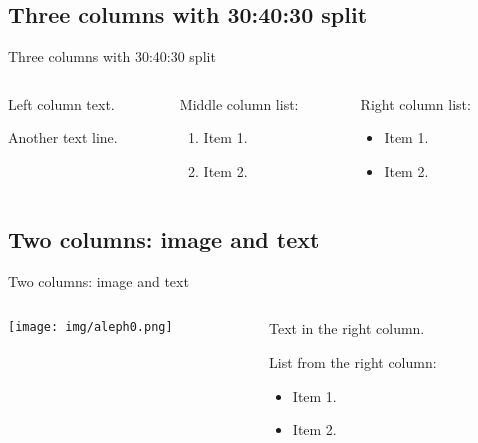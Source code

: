 \documentclass[
  ignorenonframetext,
  aspectratio=169,
  aspectratio=169]{beamer}
\providecommand{\tightlist}{%
  \setlength{\itemsep}{0pt}\setlength{\parskip}{0pt}}
\providecommand{\tightlist}{%
  \setlength{\itemsep}{0pt}\setlength{\parskip}{0pt}}
\begin{document}
\subsection{Three columns with 30:40:30
split}\label{three-columns-with-304030-split}

\begin{frame}{Three columns with 30:40:30 split}
\begin{columns}[T]
\begin{column}{0.3\textwidth}
Left column text.

Another text line.
\end{column}

\begin{column}{0.4\textwidth}
Middle column list:

\begin{enumerate}
\tightlist
\item
  Item 1.
\item
  Item 2.
\end{enumerate}
\end{column}

\begin{column}{0.3\textwidth}
Right column list:

\begin{itemize}
\tightlist
\item
  Item 1.
\item
  Item 2.
\end{itemize}
\end{column}
\end{columns}
\end{frame}

\subsection{Two columns: image and
text}\label{two-columns-image-and-text}

\begin{frame}{Two columns: image and text}
\begin{columns}[T]
\begin{column}{0.48\textwidth}
\texttt{[image: img/aleph0.png]}
\end{column}

\begin{column}{0.48\textwidth}
Text in the right column.

List from the right column:

\begin{itemize}
\tightlist
\item
  Item 1.
\item
  Item 2.
\end{itemize}
\end{column}
\end{columns}
\end{frame}
\end{document}

